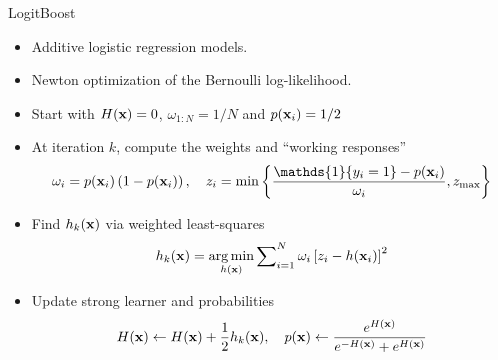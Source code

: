 \documentclass[handout]{beamer}
\renewcommand{\indFun}{\ensuremath{\mathds{1}}}
\begin{document}
\begin{frame}{LogitBoost \cite{FriedmanEtAl2000}}
\begin{itemize}[<+>]
	\item Additive logistic regression models.
	
	\item Newton optimization of the Bernoulli log-likelihood.

	\item Start with $ H(\mathrm{\mathbf{x}}) = 0 $, $ \omega_{1:N} = 1/N $ and $ p(\mathrm{\mathbf{x}}_i) = 1/2 $
	
	\item At iteration $ k $, compute the weights and ``working responses''
	\begin{align*}
		\omega_{i} = p(\mv x_i)\left(1 - p(\mv x_i)\right),
		\quad
		z_{i} = \min\left\{
			\frac{\indFun\{y_i=1\} - p(\mv x_i)}{\omega_{i}}, z_\text{max} 
		\right\}
	\end{align*}
	
	\item Find $ h_k(\mathrm{\mathbf{x}}) $ via weighted least-squares
	\begin{gather*}
		h_k(\mathrm{\mathbf{x}}) = \operatorname*{arg\,min}_{h(\mathrm{\mathbf{x}})} \sum\nolimits_{i=1}^N 
			\omega_{i}\left[ z_i - h(\mathrm{\mathbf{x}}_i) \right]^2
	\end{gather*}
	
	\item Update strong learner and probabilities
	\begin{gather*}
		H(\mathrm{\mathbf{x}}) \leftarrow H(\mathrm{\mathbf{x}}) + \frac{1}{2} h_k(\mathrm{\mathbf{x}}), \quad
		p(\mathrm{\mathbf{x}}) \leftarrow \frac{e^{H(\mathrm{\mathbf{x}})}}{e^{-H(\mathrm{\mathbf{x}})} + e^{H(\mathrm{\mathbf{x}})}}
	\end{gather*}
\end{itemize}
\end{frame}
\end{document}
